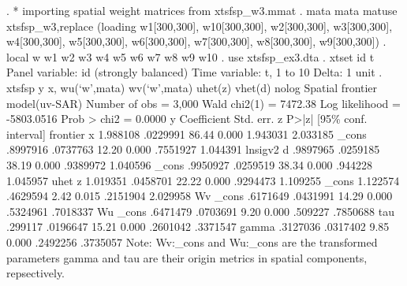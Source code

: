 . * importing spatial weight matrices from xtsfsp_w3.mmat
. mata mata matuse xtsfsp_w3,replace
(loading w1[300,300], w10[300,300], w2[300,300], w3[300,300], w4[300,300], w5[300,300], w6[300,300], w7[300,300], w8[300,300], w9[300,300])
{\smallskip}
. local w w1 w2 w3 w4 w5 w6 w7 w8 w9 w10
{\smallskip}
. use xtsfsp_ex3.dta
{\smallskip}
. xtset id t
{\smallskip}
Panel variable: id (strongly balanced)
 Time variable: t, 1 to 10
         Delta: 1 unit
{\smallskip}
. xtsfsp y x, wu(`w',mata) wv(`w',mata) uhet(z) vhet(d) nolog
{\smallskip}
Spatial frontier model(uv-SAR)                         Number of obs =   3,000
                                                       Wald chi2(1)  = 7472.38
Log likelihood = -5803.0516                            Prob > chi2   =  0.0000
{\smallskip}
           y {\VBAR} Coefficient  Std. err.      z    P>|z|     [95\% conf. interval]
frontier     {\VBAR}
           x {\VBAR}   1.988108   .0229991    86.44   0.000     1.943031    2.033185
       _cons {\VBAR}   .8997916   .0737763    12.20   0.000     .7551927    1.044391
lnsigv2      {\VBAR}
           d {\VBAR}   .9897965   .0259185    38.19   0.000     .9389972    1.040596
       _cons {\VBAR}   .9950927   .0259519    38.34   0.000      .944228    1.045957
uhet         {\VBAR}
           z {\VBAR}   1.019351   .0458701    22.22   0.000     .9294473    1.109255
       _cons {\VBAR}   1.122574   .4629594     2.42   0.015     .2151904    2.029958
Wv           {\VBAR}
       _cons {\VBAR}   .6171649   .0431991    14.29   0.000     .5324961    .7018337
Wu           {\VBAR}
       _cons {\VBAR}   .6471479   .0703691     9.20   0.000      .509227    .7850688
         tau {\VBAR}    .299117   .0196647    15.21   0.000     .2601042    .3371547
       gamma {\VBAR}   .3127036   .0317402     9.85   0.000     .2492256    .3735057
Note: Wv:_cons and Wu:_cons are the transformed parameters
      gamma and tau are their origin metrics in spatial components, repsectively.
